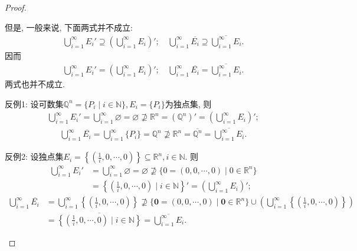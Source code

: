 \documentclass[../../main.tex]{subfiles}%
\begin{document}
\begin{proof}
\begin{enumerate}[(1)]
但是, 一般来说, 下面两式并不成立:
\begin{align*}
\bigcup_{i=1}^\infty E_i' \supseteq \left( \bigcup_{i=1}^\infty E_i \right)'; \quad \bigcup_{i=1}^\infty \overline{E_i} \supseteq \overline{\bigcup_{i=1}^\infty E_i}.
\end{align*}
因而
\begin{align*}
\bigcup_{i=1}^\infty E_i' = \left( \bigcup_{i=1}^\infty E_i \right)'; \quad \bigcup_{i=1}^\infty \overline{E_i} = \overline{\bigcup_{i=1}^\infty E_i}.
\end{align*}
两式也并不成立.

反例1: 设可数集$\mathbb{Q}^n = \{P_i \mid i \in \mathbb{N}\}, E_i = \{P_i\}$为独点集, 则
\begin{align*}
\bigcup_{i=1}^\infty E_i' = \bigcup_{i=1}^\infty \varnothing = \varnothing \not\supseteq \mathbb{R}^n = (\mathbb{Q}^n)' = \left( \bigcup_{i=1}^\infty E_i \right)';
\end{align*}
\begin{align*}
\bigcup_{i=1}^\infty \overline{E_i} = \bigcup_{i=1}^\infty \{P_i\} = \mathbb{Q}^n \not\supseteq \mathbb{R}^n = \overline{\mathbb{Q}^n} = \overline{\bigcup_{i=1}^\infty E_i}.
\end{align*}

反例2: 设独点集$E_i = \left\{ \left( \frac{1}{i},0,\cdots,0 \right) \right\} \subseteq \mathbb{R}^n, i \in \mathbb{N}$. 则
\begin{align*}
\bigcup_{i=1}^{\infty}{E_i'} &=\bigcup_{i=1}^{\infty}{\varnothing}=\varnothing \nsupseteq \{0=(0,0,\cdots ,0)\mid 0\in \mathbb{R} ^n\}
\\
&=\left\{ \left( \frac{1}{i},0,\cdots ,0 \right) \mid i\in \mathbb{N} \right\}' =\left( \bigcup_{i=1}^{\infty}{E_i} \right)' ;
\end{align*}
\begin{align*}
\bigcup_{i=1}^\infty \overline{E_i} &= \bigcup_{i=1}^\infty \left\{ \left( \frac{1}{i},0,\cdots,0 \right) \right\} \not\supseteq \{ \mathbf{0} = (0,0,\cdots,0) \mid \mathbf{0} \in \mathbb{R}^n \} \cup \left( \bigcup_{i=1}^\infty \left\{ \left( \frac{1}{i},0,\cdots,0 \right) \right\} \right) \\
&= \overline{\left\{ \left( \frac{1}{i},0,\cdots,0 \right) \mid i \in \mathbb{N} \right\}} = \overline{\bigcup_{i=1}^\infty E_i}.
\end{align*}
\end{enumerate}
\end{proof}
\end{document}

